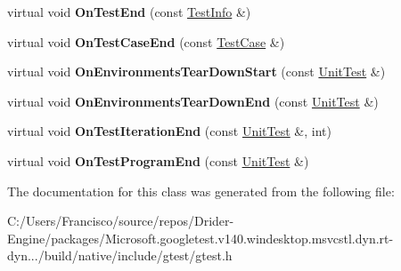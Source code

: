 \begin{DoxyCompactItemize}
\item 
\mbox{\label{classtesting_1_1_empty_test_event_listener_afd58d21005f0d0d0399fb114627545d3}} 
virtual void {\bfseries On\+Test\+End} (const \hyperlink{classtesting_1_1_test_info}{Test\+Info} \&)
\item 
\mbox{\label{classtesting_1_1_empty_test_event_listener_a6bec703158283104c4298f7d8a528515}} 
virtual void {\bfseries On\+Test\+Case\+End} (const \hyperlink{classtesting_1_1_test_case}{Test\+Case} \&)
\item 
\mbox{\label{classtesting_1_1_empty_test_event_listener_a00fa1a4ea5831e20746188414268e7c6}} 
virtual void {\bfseries On\+Environments\+Tear\+Down\+Start} (const \hyperlink{classtesting_1_1_unit_test}{Unit\+Test} \&)
\item 
\mbox{\label{classtesting_1_1_empty_test_event_listener_aea64c83c415b33a4c0b0239bafd1438d}} 
virtual void {\bfseries On\+Environments\+Tear\+Down\+End} (const \hyperlink{classtesting_1_1_unit_test}{Unit\+Test} \&)
\item 
\mbox{\label{classtesting_1_1_empty_test_event_listener_a2253e5a18b3cf7bccd349567a252209d}} 
virtual void {\bfseries On\+Test\+Iteration\+End} (const \hyperlink{classtesting_1_1_unit_test}{Unit\+Test} \&, int)
\item 
\mbox{\label{classtesting_1_1_empty_test_event_listener_a0abcc02bd2331a2e29ad6f4d9daf2a32}} 
virtual void {\bfseries On\+Test\+Program\+End} (const \hyperlink{classtesting_1_1_unit_test}{Unit\+Test} \&)
\end{DoxyCompactItemize}


The documentation for this class was generated from the following file\+:\begin{DoxyCompactItemize}
\item 
C\+:/\+Users/\+Francisco/source/repos/\+Drider-\/\+Engine/packages/\+Microsoft.\+googletest.\+v140.\+windesktop.\+msvcstl.\+dyn.\+rt-\/dyn.../build/native/include/gtest/gtest.\+h\end{DoxyCompactItemize}
